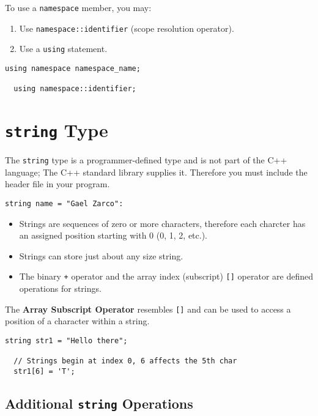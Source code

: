 \documentclass{article}
\begin{document}
To use a \texttt{namespace} member, you may:

\begin{enumerate}
  \item Use \texttt{namespace::identifier} (scope resolution operator).
  \item Use a \texttt{using} statement.
\end{enumerate}

\begin{lstlisting}[caption={\texttt{using} Statement Syntax (Two Ways)
}]
  using namespace namespace_name;

  using namespace::identifier;
\end{lstlisting}

\section{\texttt{string} Type}
The \texttt{string} type is a programmer-defined type and is not part of the C++
language; The C++ standard library supplies it. Therefore you must include the
header file in your program.

\begin{lstlisting}[caption={\texttt{string} Type Example}]
  string name = "Gael Zarco":
\end{lstlisting}

\begin{itemize}
  \item Strings are sequences of zero or more characters, therefore each
    charcter has an assigned position starting with 0 (0, 1, 2, etc.).
  \item Strings can store just about any size string. 
  \item The binary \texttt{+} operator and the array index (subscript) 
    \texttt{[]} operator are defined operations for strings.
\end{itemize}

The \textbf{Array Subscript Operator} resembles \texttt{[]} and can be used to
access a position of a character within a string.

\begin{lstlisting}[caption={Indexing Into A \texttt{string}}]
  string str1 = "Hello there";

  // Strings begin at index 0, 6 affects the 5th char
  str1[6] = 'T';
\end{lstlisting}

\subsection{Additional \texttt{string} Operations}
\end{document}
